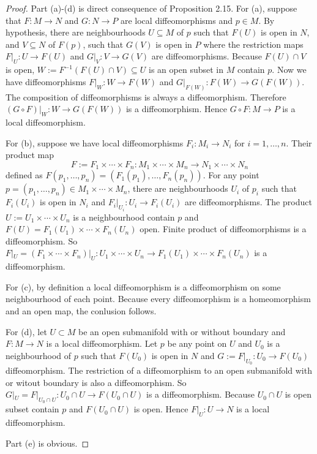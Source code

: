 \documentclass[a4paper]{article}
\theoremstyle{remark}
\begin{document}
\begin{proof}
Part (a)-(d) is direct consequence of Proposition 2.15. For (a), suppose that $F: M \to N$ and $G : N \to P$ are local diffeomorphisms and $p \in M$. By hypothesis, there are neighbourhoods $U\subseteq M$ of $p$ such that $F(U)$ is open in $N$, and $V\subseteq N$ of $F(p)$, such that $G(V)$ is open in $P$ where the restriction maps $F|_{U} : U \to F(U)$ and $G|_{V} : V \to G(V)$ are diffeomorphisms. Because $F(U) \cap V$ is open, $W:=F^{-1}(F(U)\cap V) \subseteq U$ is an open subset in $M$ contain $p$. Now we have diffeomorphisms $F|_{W} : W \to F(W)$ and $G|_{F(W)} : F(W) \to G(F(W))$. The composition of diffeomorphisms is always a diffeomorphism. Therefore $(G \circ F)|_{W} : W \to G(F(W))$ is a diffeomorphism. Hence $G \circ F : M \to P$ is a local diffeomorphism.

For (b), suppose we have local diffeomorphisms $F_i : M_i \to N_i$ for $i=1,\dots,n$. Their product map 
$$
F := F_1 \times \cdots \times F_n : M_1 \times \cdots \times M_n \to N_1 \times \cdots \times N_n
$$
defined as $F(p_1,\dots,p_n)=(F_1(p_1),\dots,F_n(p_n))$. For any point $p=(p_1,\dots,p_n) \in  M_1 \times \cdots \times M_n $, there are neighbourhoods $U_i$ of $p_i$ such that $F_i(U_i)$ is open in $N_i$ and $F_i|_{U_i} : U_i \to F_i(U_i)$ are diffeomorphisms. The product $U:=U_1 \times \cdots \times U_n$ is a neighbourhood contain $p$ and $F(U)=F_1(U_1) \times \cdots \times F_n(U_n)$ open. Finite product of diffeomorphisms is a diffeomorphism. So $F|_U = (F_1 \times \cdots \times F_n)|_U : U_1 \times \cdots \times U_n \to F_1(U_1) \times \cdots \times F_n(U_n)$ is a diffeomorphism. 

For (c), by definition a local diffeomorphism is a diffeomorphism on some neighbourhood of each point. Because every diffeomorphism is a homeomorphism and an open map, the conlusion follows.

For (d), let $U \subset M$ be an open submanifold with or without boundary and $F : M \to N$ is a local diffeomorphism. Let $p$ be any point on $U$ and $U_0$ is a neighbourhood of $p$ such that $F(U_0)$ is open in $N$ and $G:=F|_{U_0} :U_0 \to F(U_0)$ diffeomorphism. The restriction of a diffeomorphism to an open submanifold with or witout boundary is also a diffeomorphism. So $G|_U = F|_{U_0 \cap U} : U_0 \cap U \to F(U_0 \cap U)$ is a diffeomorphism. Because $U_0\cap U$ is open subset contain $p$ and $F(U_0\cap U)$ is open. Hence $F|_U : U \to N$ is a local diffeomorphism.

Part (e) is obvious.


\end{proof}
\end{document}
